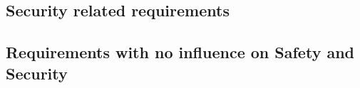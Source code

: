 





        
	 	

\subsection{Security related requirements}


\subsection{Requirements with no influence on Safety and Security}
